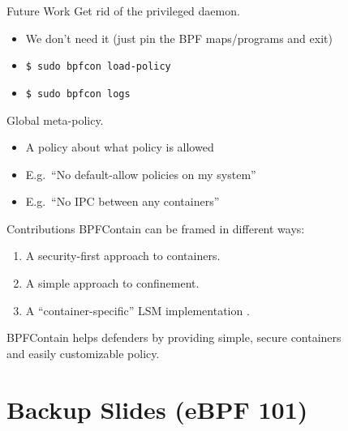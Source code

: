 \documentclass[12pt, dvipsnames, aspectratio=169]{beamer}
\begin{document}
\begin{frame}[c]{Future Work}
Get rid of the privileged daemon.
\begin{itemize}
  \item We don't need it (just pin the BPF maps/programs and exit)
  \item \texttt{\$ sudo bpfcon load-policy}
  \item \texttt{\$ sudo bpfcon logs}
\end{itemize}
\vfill
Global meta-policy.
\begin{itemize}
  \item A policy about what policy is allowed
  \item E.g.~\enquote{No default-allow policies on my system}
  \item E.g.~\enquote{No IPC between any containers}
\end{itemize}
\end{frame}

\begin{frame}[c]{Contributions}
BPFContain can be framed in different ways:
\begin{enumerate}
  \item A security-first approach to containers.
  \item A simple approach to confinement.
  \item A \enquote{container-specific} LSM implementation \cite{sultan2019_container_security}.
\end{enumerate}
\vfill
\begin{center}
BPFContain helps defenders by providing simple, secure containers\\and easily customizable policy.
\end{center}
\end{frame}

\appendix

\section{Backup Slides (eBPF 101)}
\end{document}
